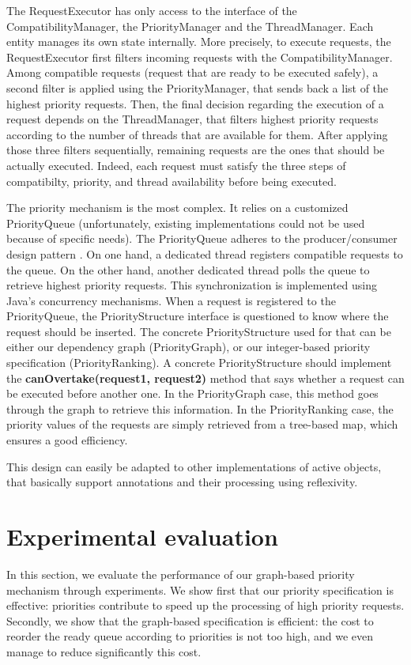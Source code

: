\documentclass[11pt]{report}
\begin{document}
The RequestExecutor has only access to the interface of the CompatibilityManager, the PriorityManager and the ThreadManager. Each entity manages its own state internally. More precisely, to execute requests, the RequestExecutor first filters incoming requests with the CompatibilityManager. Among compatible requests (request that are ready to be executed safely), a second filter is applied using the PriorityManager, that sends back a list of the highest priority requests. Then, the final decision regarding the execution of a request depends on the ThreadManager, that filters highest priority requests according to the number of threads that are available for them. After applying those three filters sequentially, remaining requests are the ones that should be actually executed. Indeed, each request must satisfy the three steps of compatibilty, priority, and thread availability before being executed. 

The priority mechanism is the most complex. It relies on a customized PriorityQueue (unfortunately, existing implementations could not be used because of specific needs). The PriorityQueue adheres to the producer/consumer design pattern \cite{ref:producerconsumer}. On one hand, a dedicated thread registers compatible requests to the queue. On the other hand, another dedicated thread polls the queue to retrieve highest priority requests. This synchronization is implemented using Java's concurrency mechanisms. When a request is registered to the PriorityQueue, the PriorityStructure interface is questioned to know where the request should be inserted. The concrete PriorityStructure used for that can be either our dependency graph (PriorityGraph), or our integer-based priority specification (PriorityRanking). A concrete PriorityStructure should implement the \textbf{canOvertake(request1, request2)} method that says whether a request can be executed before another one. In the PriorityGraph case, this method goes through the graph to retrieve this information. In the PriorityRanking case, the priority values of the requests are simply retrieved from a tree-based map, which ensures a good efficiency.

This design can easily be adapted to other implementations of active objects, that basically support annotations and their processing using reflexivity. 


\section{Experimental evaluation}\label{sec:experiments}
In this section, we evaluate the performance of our graph-based priority mechanism through experiments. 
We show first that our priority specification is effective: priorities contribute to speed up the processing of high priority requests. Secondly, we show that the graph-based specification is efficient: the cost to reorder the ready queue according to priorities is not too high, and we even manage to reduce significantly this cost.
\end{document}
